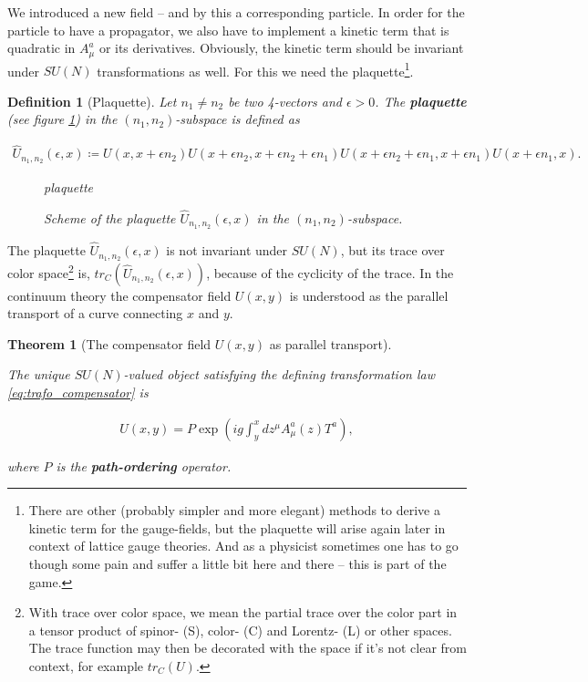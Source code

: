 \documentclass{article}
\theoremstyle{plain} %
\newtheorem{theorem}{Theorem}[section]
\newtheorem{definition}{Definition}[section]
\theoremstyle{convention} %
\theoremstyle{remark} %
\def\df#1{\textbf{\textit{#1}}}
\numberwithin{equation}{section}
\begin{document}
We introduced a new field -- and by this a corresponding particle. In order for the particle to have a propagator, we also have to implement a kinetic term that is quadratic in $A_{\mu}^a$ or its derivatives. Obviously, the kinetic term should be invariant under $SU(N)$ transformations as well. For this we need the plaquette\footnote{There are other (probably simpler and more elegant) methods to derive a kinetic term for the gauge-fields, but the plaquette will arise again later in context of lattice gauge theories. And as a physicist sometimes one has to go though some pain and suffer a little bit here and there -- this is part of the game.}.

\begin{definition}[Plaquette]

Let $n_1 \neq n_2$ be two 4-vectors and $\epsilon > 0$. The \df{plaquette} (see figure \ref{fig:plaquette}) in the $(n_1, n_2)$-subspace is defined as 

\begin{align}
    \hat{U}_{n_1,n_2}(\epsilon,x) \coloneqq U(x, x + \epsilon n_2) U(x + \epsilon n_2, x + \epsilon n_2 + \epsilon n_1) U(x + \epsilon n_2 + \epsilon n_1, x + \epsilon n_1) U(x + \epsilon n_1, x).
\end{align}

\begin{figure}[H]
  \centering
  {plaquette}
  \caption{Scheme of the plaquette $\hat{U}_{n_1,n_2}(\epsilon,x)$ in the $(n_1, n_2)$-subspace.}
  \label{fig:plaquette}
\end{figure}

\end{definition}

The plaquette $\hat{U}_{n_1,n_2}(\epsilon,x)$ is not invariant under $SU(N)$, but its trace over color space\footnote{With trace over color space, we mean the partial trace over the color part in a tensor product of spinor- (S), color- (C) and Lorentz- (L) or other spaces. The trace function may then be decorated with the space if it's not clear from context, for example $tr_C(U)$.} is, $tr_C(\hat{U}_{n_1,n_2}(\epsilon,x))$, because of the cyclicity of the trace. In the continuum theory the compensator field $U(x,y)$ is understood as the parallel transport of a curve connecting $x$ and $y$.

\begin{theorem}[The compensator field $U(x,y)$ as parallel transport]

\label{thm:pexp}

The unique $SU(N)$-valued object satisfying the defining transformation law \eqref{eq:trafo_compensator} is

\begin{align}
    U(x,y) = P \exp( ig \int_{y}^{x} d z^{\mu} A_{\mu}^a(z) T^a ), \label{eq:realu}
\end{align}

where $P$ is the \df{path-ordering} operator.

\end{theorem}
\end{document}
